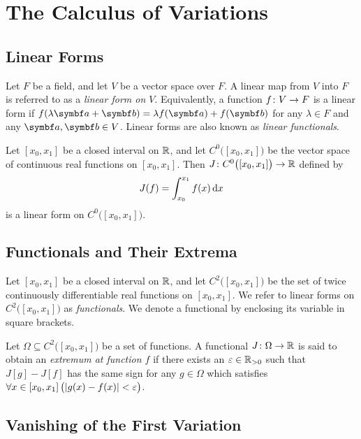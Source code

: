 



\section{The Calculus of Variations}

\subsection{Linear Forms}

Let \(F\) be a field, and let \(V\) be a vector space over \(F\). A linear map from \(V\) into \(F\) is referred to as a
\emph{linear form on \(V\)}. Equivalently, a function \(f\colon V\to F\) is a linear form if \(f(\lambda \vct{a}
+ \vct{b}) = \lambda f(\vct{a}) + f(\vct{b})\) for any \(\lambda \in F\) and any \(\vct{a}, \vct{b} \in V\). Linear
forms are also known as \emph{linear functionals}.

Let \([x_0, x_1]\) be a closed interval on \(\mathbb{R}\), and let \(C^0\big([x_0, x_1]\big)\) be the vector space of
continuous real functions on \([x_0, x_1]\). Then \(J\colon C^0\big([x_0, x_1]\big)\to\mathbb{R}\) defined by
\[
  J(f) = \int_{x_0}^{x_1} f(x) \mathop{}\!\mathrm{d} x
\]
is a linear form on \(C^0\big([x_0, x_1]\big)\).

\subsection{Functionals and Their Extrema}

Let \([x_0, x_1]\) be a closed interval on \(\mathbb{R}\), and let \(C^2\big([x_0, x_1]\big)\) be the set of twice
continuously differentiable real functions on \([x_0, x_1]\). We refer to linear forms on \(C^2\big([x_0, x_1]\big)\) as
\emph{functionals}. We denote a functional by enclosing its variable in square brackets.

Let \(\Omega \subseteq C^2\big([x_0, x_1]\big)\) be a set of functions. A functional \(J\colon\Omega\to\mathbb{R}\) is
said to obtain an \emph{extremum at function \(f\)} if there exists an \(\varepsilon \in \mathbb{R}_{>0}\) such that \(J[g]
- J[f]\) has the same sign for any \(g \in \Omega\) which satisfies \(\forall x \in [x_0, x_1] \, \big(\lvert g(x) - f(x)\rvert
< \varepsilon\big)\).

\subsection{Vanishing of the First Variation}
\label{subsec01}

